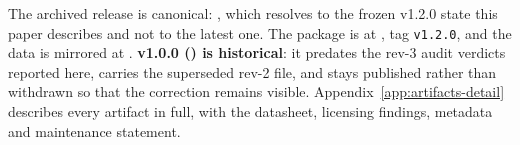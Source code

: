 %
%
The archived release is canonical: \textbf{\versiondoi}, which resolves to the
frozen v1.2.0 state this paper describes and not to the latest one. The package
is at \repourl, tag \texttt{v1.2.0}, and the data is mirrored at \dataseturl.
\textbf{v1.0.0 (\priorversiondoi) is historical}: it predates the rev-3 audit
verdicts reported here, carries the superseded rev-2 file, and stays published
rather than withdrawn so that the correction remains visible.
Appendix~\ref{app:artifacts-detail} describes every artifact in full, with the
datasheet, licensing findings, metadata and maintenance statement.
